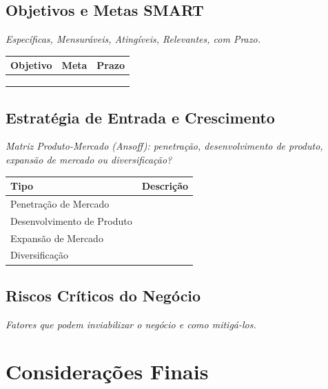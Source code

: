 \documentclass[
	12pt,
	openright,
	oneside,
	a4paper,
	chapter=TITLE,
	section=TITLE,
	english,
	brazil
	]{abntex2}
\newcommand{\tcampo}[1]{%
	{#1}%
}
\newcommand{\instrucao}[1]{%
	\vspace{0.3cm}%
	\noindent%
	{%
		\setlength{\fboxsep}{6pt}%
		\colorbox{azul-claro}{%
			\begin{minipage}{\dimexpr\textwidth-2\fboxsep\relax}%
				\setlength{\parindent}{1.25cm}%
				{\color{cinza-instrucao}\small\itshape #1}%
			\end{minipage}%
		}%
	}%
	\vspace{0.3cm}%
}
\begin{document}
\section{Objetivos e Metas SMART}

\instrucao{Específicas, Mensuráveis, Atingíveis, Relevantes, com Prazo.}

\centering
\begin{tabularx}{\textwidth}{X X c}
\toprule
\rowcolor{azul-claro}
\textbf{Objetivo} & \textbf{Meta} & \textbf{Prazo} \\
\midrule
\tcampo{} & \tcampo{} & \tcampo{} \\
\tcampo{} & \tcampo{} & \tcampo{} \\
\tcampo{} & \tcampo{} & \tcampo{} \\
\bottomrule
\end{tabularx}

\section{Estratégia de Entrada e Crescimento}

\instrucao{Matriz Produto-Mercado (Ansoff): penetração, desenvolvimento de produto, expansão de mercado ou diversificação?}

\centering
\begin{tabularx}{\textwidth}{X X}
\toprule
\rowcolor{azul-claro}
\textbf{Tipo} & \textbf{Descrição} \\
\midrule
Penetração de Mercado       & \tcampo{} \\
Desenvolvimento de Produto  & \tcampo{} \\
Expansão de Mercado         & \tcampo{} \\
Diversificação              & \tcampo{} \\
\bottomrule
\end{tabularx}

\section{Riscos Críticos do Negócio}

\instrucao{Fatores que podem inviabilizar o negócio e como mitigá-los.}

\clearpage

\chapter{Considerações Finais}
\end{document}
